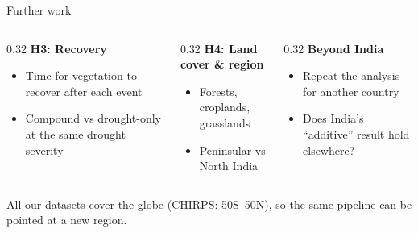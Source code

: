 \documentclass[aspectratio=169,xcolor=table]{beamer}
\begin{document}
\begin{frame}{Further work}

\begin{columns}[T]
  \begin{column}{0.32\textwidth}
    \textbf{\alert{H3: Recovery}}
    \begin{itemize}
      \item Time for vegetation to recover after each event
      \item Compound vs drought-only at the same drought severity
    \end{itemize}
  \end{column}

  \begin{column}{0.32\textwidth}
    \textbf{\alert{H4: Land cover \& region}}
    \begin{itemize}
      \item Forests, croplands, grasslands
      \item Peninsular vs North India
    \end{itemize}
  \end{column}

  \begin{column}{0.32\textwidth}
    \textbf{\alert{Beyond India}}
    \begin{itemize}
      \item Repeat the analysis for another country
      \item Does India's ``additive'' result hold elsewhere?
    \end{itemize}
  \end{column}
\end{columns}

\vfill
{\small All our datasets cover the globe (CHIRPS: 50\textdegree S--50\textdegree N), so the same pipeline can be pointed at a new region.}

\end{frame}
\end{document}

